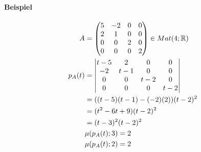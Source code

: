 \paragraph{Beispiel}
\begin{align}
A &= \begin{pmatrix} 5 & -2 & 0 & 0 \\ 2 & 1 & 0 & 0 \\ 0 & 0 & 2 & 0 \\ 0 & 0 & 0 & 2 \end{pmatrix} \in Mat(4; \mathbb{R}) \\
p_A(t) &= \begin{vmatrix} t-5 & 2 & 0 & 0 \\ -2 & t-1 & 0 & 0 \\ 0 & 0 & t-2 & 0 \\ 0 & 0 & 0 & t-2 \end{vmatrix} \\
&= ((t-5)(t-1)-(-2)(2))(t-2)^2 \\
&= (t^2 - 6t + 9)(t-2)^2 \\
&= (t-3)^2(t-2)^2 \\
&\mu(p_A(t); 3) = 2 \\
&\mu(p_A(t); 2) = 2
\end{align}

